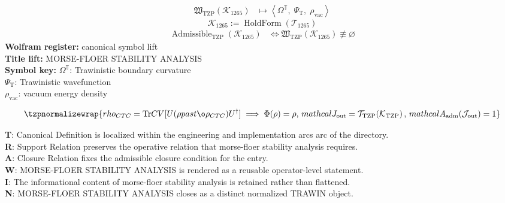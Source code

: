 \noindent
\begin{minipage}[t]{0.48\linewidth}
\begingroup
\small
\[
\begin{aligned}
\mathfrak{W}_{\mathrm{TZP}}\!\left(\mathcal{K}_{1265}\right)
&\longmapsto
\left\langle \Omega^{\mathbb{T}},\; \Psi_{\mathrm{T}},\; \rho_{\mathrm{vac}} \right\rangle
\end{aligned}
\]
\[
\mathcal{K}_{1265}
:=
\operatorname{HoldForm}\!\left(\mathcal{T}_{1265}\right)
\]
\[
\begin{aligned}
\operatorname{Admissible}_{\mathrm{TZP}}\!\left(\mathcal{K}_{1265}\right)
&\Longleftrightarrow
\mathfrak{W}_{\mathrm{TZP}}\!\left(\mathcal{K}_{1265}\right)\not\equiv\varnothing
\end{aligned}
\]
\textbf{Wolfram register:} canonical symbol lift\\
\textbf{Title lift:} MORSE-FLOER STABILITY ANALYSIS\\
\textbf{Symbol key:} \(\Omega^{\mathbb{T}}\): Trawinistic boundary curvature\\ \(\Psi_{\mathrm{T}}\): Trawinistic wavefunction\\ \(\rho_{\mathrm{vac}}\): vacuum energy density
\par
\endgroup
\end{minipage}\hfill
\begin{minipage}[t]{0.48\linewidth}
\[
\tzpnormalizewrap{rho_{CTC} = \text{Tr} {CV} [ U (\rho {past} \o\rho_{CTC}) U^\dagger ] \implies \Phi(\rho) = \rho,\,mathcal{J}_{\mathrm{out}} = \mathcal{T}_{\mathrm{TZP}}\!\left(\mathcal{K}_{\mathrm{TZP}}\right),\,mathcal{A}_{\mathrm{adm}}\!\left(\mathcal{J}_{\mathrm{out}}\right)=1}
\]

\small
\textbf{T}: Canonical Definition is localized within the engineering and implementation arcs arc of the directory.\\
\textbf{R}: Support Relation preserves the operative relation that morse-floer stability analysis requires.\\
\textbf{A}: Closure Relation fixes the admissible closure condition for the entry.\\
\textbf{W}: MORSE-FLOER STABILITY ANALYSIS is rendered as a reusable operator-level statement.\\
\textbf{I}: The informational content of morse-floer stability analysis is retained rather than flattened.\\
\textbf{N}: MORSE-FLOER STABILITY ANALYSIS closes as a distinct normalized TRAWIN object.
\normalsize
\end{minipage}

